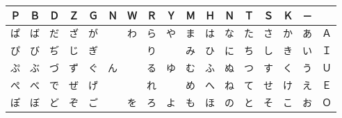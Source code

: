 \begin{center}
\begin{tabular}{|ccccc|c|cccccccccc|c|}
\hline
Ｐ & Ｂ & Ｄ & Ｚ & Ｇ & Ｎ & Ｗ & Ｒ & Ｙ & Ｍ & Ｈ & Ｎ & Ｔ & Ｓ & Ｋ & － & 　 \\\hline
ぱ & ば & だ & ざ & が & 　 & わ & ら & や & ま & は & な & た & さ & か & あ & Ａ \\
ぴ & び & ぢ & じ & ぎ & 　 & 　 & り & 　 & み & ひ & に & ち & し & き & い & Ｉ \\
ぷ & ぶ & づ & ず & ぐ & ん & 　 & る & ゆ & む & ふ & ぬ & つ & す & く & う & Ｕ \\
ぺ & べ & で & ぜ & げ & 　 & 　 & れ & 　 & め & へ & ね & て & せ & け & え & Ｅ \\
ぽ & ぼ & ど & ぞ & ご & 　 & を & ろ & よ & も & ほ & の & と & そ & こ & お & Ｏ \\
\hline
\end{tabular}
\end{center}
